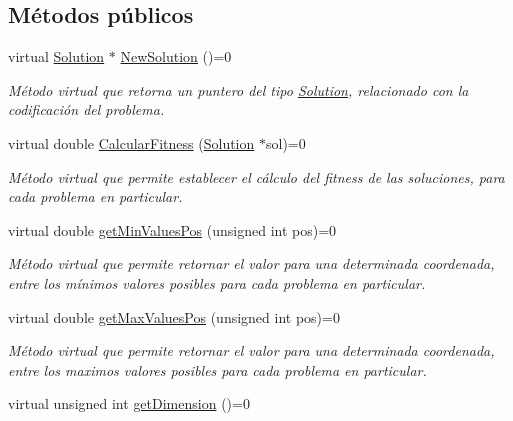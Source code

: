 \subsection*{Métodos públicos}
\begin{DoxyCompactItemize}
\item 
\hypertarget{class_problem_a4b9787b3945dbec08e402c0cfd0f646b}{virtual \hyperlink{class_solution}{Solution} $\ast$ \hyperlink{class_problem_a4b9787b3945dbec08e402c0cfd0f646b}{New\+Solution} ()=0}\label{class_problem_a4b9787b3945dbec08e402c0cfd0f646b}

\begin{DoxyCompactList}\small\item\em Método virtual que retorna un puntero del tipo \hyperlink{class_solution}{Solution}, relacionado con la codificación del problema. \end{DoxyCompactList}\item 
\hypertarget{class_problem_adc6176be667576d08cf3e89b65e905f4}{virtual double \hyperlink{class_problem_adc6176be667576d08cf3e89b65e905f4}{Calcular\+Fitness} (\hyperlink{class_solution}{Solution} $\ast$sol)=0}\label{class_problem_adc6176be667576d08cf3e89b65e905f4}

\begin{DoxyCompactList}\small\item\em Método virtual que permite establecer el cálculo del fitness de las soluciones, para cada problema en particular. \end{DoxyCompactList}\item 
\hypertarget{class_problem_ad6a122249b93487f91a64837a056fa75}{virtual double \hyperlink{class_problem_ad6a122249b93487f91a64837a056fa75}{get\+Min\+Values\+Pos} (unsigned int pos)=0}\label{class_problem_ad6a122249b93487f91a64837a056fa75}

\begin{DoxyCompactList}\small\item\em Método virtual que permite retornar el valor para una determinada coordenada, entre los mínimos valores posibles para cada problema en particular. \end{DoxyCompactList}\item 
\hypertarget{class_problem_a2ffe7de8658a25398d6a21dd1b2edfcb}{virtual double \hyperlink{class_problem_a2ffe7de8658a25398d6a21dd1b2edfcb}{get\+Max\+Values\+Pos} (unsigned int pos)=0}\label{class_problem_a2ffe7de8658a25398d6a21dd1b2edfcb}

\begin{DoxyCompactList}\small\item\em Método virtual que permite retornar el valor para una determinada coordenada, entre los maximos valores posibles para cada problema en particular. \end{DoxyCompactList}\item 
\hypertarget{class_problem_a6f72067600654aef0767bce95c4eacdd}{virtual unsigned int \hyperlink{class_problem_a6f72067600654aef0767bce95c4eacdd}{get\+Dimension} ()=0}\label{class_problem_a6f72067600654aef0767bce95c4eacdd}


\end{DoxyCompactItemize}
